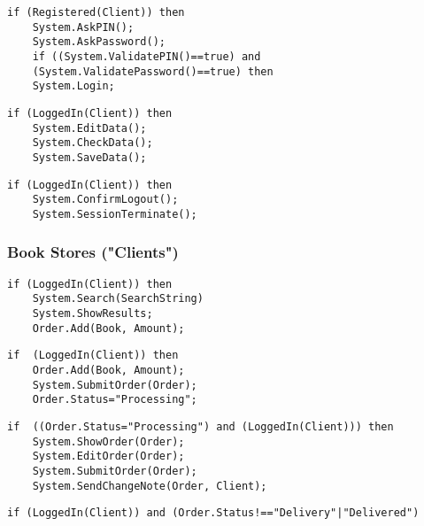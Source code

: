 \begin{lstlisting}[caption=/PF03/ Login]
 if (Registered(Client)) then
 	System.AskPIN();
 	System.AskPassword();
 	if ((System.ValidatePIN()==true) and
 	(System.ValidatePassword()==true) then
 	System.Login;
\end{lstlisting}
\begin{lstlisting}[caption=/PF04/ Update Account Information]
 if (LoggedIn(Client)) then
 	System.EditData();
 	System.CheckData();
 	System.SaveData();
\end{lstlisting}
\begin{lstlisting}[caption=/PF05/ Logout]
 if (LoggedIn(Client)) then
 	System.ConfirmLogout();
 	System.SessionTerminate();
\end{lstlisting}

\subsubsection{Book Stores ("Clients")}
\begin{lstlisting}[caption=/PF40/ Search for a Book / Show Catalogue]
 if (LoggedIn(Client)) then
 	System.Search(SearchString)
 	System.ShowResults;
 	Order.Add(Book, Amount);
\end{lstlisting}
\begin{lstlisting}[caption=/PF17/ Book Store Order via Web Interface]
if  (LoggedIn(Client)) then
	Order.Add(Book, Amount);
	System.SubmitOrder(Order);
	Order.Status="Processing";
\end{lstlisting}
\begin{lstlisting}[caption=/PF18/ Change Order]
if  ((Order.Status="Processing") and (LoggedIn(Client))) then
	System.ShowOrder(Order);
	System.EditOrder(Order);
	System.SubmitOrder(Order);
	System.SendChangeNote(Order, Client);
\end{lstlisting}
\begin{lstlisting}[caption=/PF19/ Cancel Order]
if (LoggedIn(Client)) and (Order.Status!=="Delivery"|"Delivered")
 
\end{lstlisting}